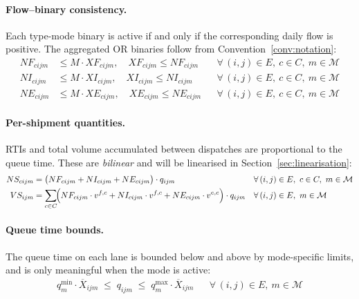 
\paragraph{Flow--binary consistency.}
Each type-mode binary is active if and only if the corresponding
daily flow is positive. The aggregated OR binaries follow from
Convention~\ref{conv:notation}:
%
\begin{align}
  NF_{cijm} &\leq M \cdot XF_{cijm},
  \quad XF_{cijm} \leq NF_{cijm}
  && \forall\,(i,j)\in E,\ c\in C,\ m\in\mathcal{M}
  \label{eq:binary-full}\\
  NI_{cijm} &\leq M \cdot XI_{cijm},
  \quad XI_{cijm} \leq NI_{cijm}
  && \forall\,(i,j)\in E,\ c\in C,\ m\in\mathcal{M}
  \label{eq:binary-inlay}\\
  NE_{cijm} &\leq M \cdot XE_{cijm},
  \quad XE_{cijm} \leq NE_{cijm}
  && \forall\,(i,j)\in E,\ c\in C,\ m\in\mathcal{M}
  \label{eq:binary-empty}
\end{align}


\paragraph{Per-shipment quantities.}
RTIs and total volume accumulated between dispatches are
proportional to the queue time. These are \emph{bilinear} and will
be linearised in Section~\ref{sec:linearisation}:
%
\begin{align}
  NS_{cijm}
  &= \bigl(NF_{cijm}+NI_{cijm}+NE_{cijm}\bigr)
     \cdot q_{ijm}
  && \forall\,(i,j)\in E,\ c\in C,\ m\in\mathcal{M}
  \label{eq:ship-N}\\
  VS_{ijm}
  &= \sum_{c\in C}\!\Bigl(
       NF_{cijm}\cdot v^{f,c}
      +NI_{cijm}\cdot v^{f,c}
      +NE_{cijm}\cdot v^{e,c}
     \Bigr)\cdot q_{ijm}
  && \forall\,(i,j)\in E,\ m\in\mathcal{M}
  \label{eq:ship-vol}
\end{align}
\paragraph{Queue time bounds.}
The queue time on each lane is bounded below and above by
mode-specific limits, and is only meaningful when the mode is
active:
%
\begin{align}
  q^{\min}_{m}\cdot\overline{X}_{ijm}
  \;\leq\; q_{ijm}
  \;\leq\; q^{\max}_{m}\cdot\overline{X}_{ijm}
  && \forall\,(i,j)\in E,\ m\in\mathcal{M}
  \label{eq:q-bounds}
\end{align}

